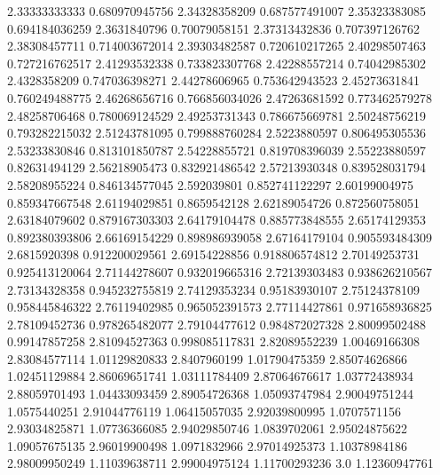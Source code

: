  2.33333333333   0.680970945756
  2.34328358209   0.687577491007
  2.35323383085   0.694184036259
   2.3631840796    0.70079058151
  2.37313432836   0.707397126762
  2.38308457711   0.714003672014
  2.39303482587   0.720610217265
  2.40298507463   0.727216762517
  2.41293532338   0.733823307768
  2.42288557214    0.74042985302
   2.4328358209   0.747036398271
  2.44278606965   0.753642943523
  2.45273631841   0.760249488775
  2.46268656716   0.766856034026
  2.47263681592   0.773462579278
  2.48258706468   0.780069124529
  2.49253731343   0.786675669781
  2.50248756219   0.793282215032
  2.51243781095   0.799888760284
   2.5223880597   0.806495305536
  2.53233830846   0.813101850787
  2.54228855721   0.819708396039
  2.55223880597    0.82631494129
  2.56218905473   0.832921486542
  2.57213930348   0.839528031794
  2.58208955224   0.846134577045
    2.592039801   0.852741122297
  2.60199004975   0.859347667548
  2.61194029851     0.8659542128
  2.62189054726   0.872560758051
  2.63184079602   0.879167303303
  2.64179104478   0.885773848555
  2.65174129353   0.892380393806
  2.66169154229   0.898986939058
  2.67164179104   0.905593484309
   2.6815920398   0.912200029561
  2.69154228856   0.918806574812
  2.70149253731   0.925413120064
  2.71144278607   0.932019665316
  2.72139303483   0.938626210567
  2.73134328358   0.945232755819
  2.74129353234    0.95183930107
  2.75124378109   0.958445846322
  2.76119402985   0.965052391573
  2.77114427861   0.971658936825
  2.78109452736   0.978265482077
  2.79104477612   0.984872027328
  2.80099502488    0.99147857258
  2.81094527363   0.998085117831
  2.82089552239    1.00469166308
  2.83084577114    1.01129820833
   2.8407960199    1.01790475359
  2.85074626866    1.02451129884
  2.86069651741    1.03111784409
  2.87064676617    1.03772438934
  2.88059701493    1.04433093459
  2.89054726368    1.05093747984
  2.90049751244     1.0575440251
  2.91044776119    1.06415057035
  2.92039800995     1.0707571156
  2.93034825871    1.07736366085
  2.94029850746     1.0839702061
  2.95024875622    1.09057675135
  2.96019900498     1.0971832966
  2.97014925373    1.10378984186
  2.98009950249    1.11039638711
  2.99004975124    1.11700293236
            3.0    1.12360947761
